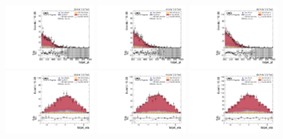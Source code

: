 \begin{figure}[!ht]
  \centering
  \includegraphics[width=0.30\textwidth]{analysis_plots/2016_zv/cr_vjets_l/fatjet_pt.pdf}
  \includegraphics[width=0.30\textwidth]{analysis_plots/2017_zv/cr_vjets_l/fatjet_pt.pdf}
  \includegraphics[width=0.30\textwidth]{analysis_plots/2018_zv/cr_vjets_l/fatjet_pt.pdf} \\
  \includegraphics[width=0.30\textwidth]{analysis_plots/2016_zv/cr_vjets_l/fatjet_eta.pdf}
  \includegraphics[width=0.30\textwidth]{analysis_plots/2017_zv/cr_vjets_l/fatjet_eta.pdf}
  \includegraphics[width=0.30\textwidth]{analysis_plots/2018_zv/cr_vjets_l/fatjet_eta.pdf} \\

\end{figure}
